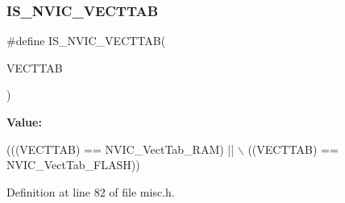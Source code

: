 \subsubsection{\texorpdfstring{I\+S\+\_\+\+N\+V\+I\+C\+\_\+\+V\+E\+C\+T\+T\+AB}{IS\_NVIC\_VECTTAB}}
{\footnotesize\ttfamily \#define I\+S\+\_\+\+N\+V\+I\+C\+\_\+\+V\+E\+C\+T\+T\+AB(\begin{DoxyParamCaption}\item[{}]{V\+E\+C\+T\+T\+AB }\end{DoxyParamCaption})}

{\bfseries Value\+:}
\begin{DoxyCode}
(((VECTTAB) == NVIC\_VectTab\_RAM) || \(\backslash\)
                                  ((VECTTAB) == NVIC\_VectTab\_FLASH))
\end{DoxyCode}


Definition at line 82 of file misc.\+h.

